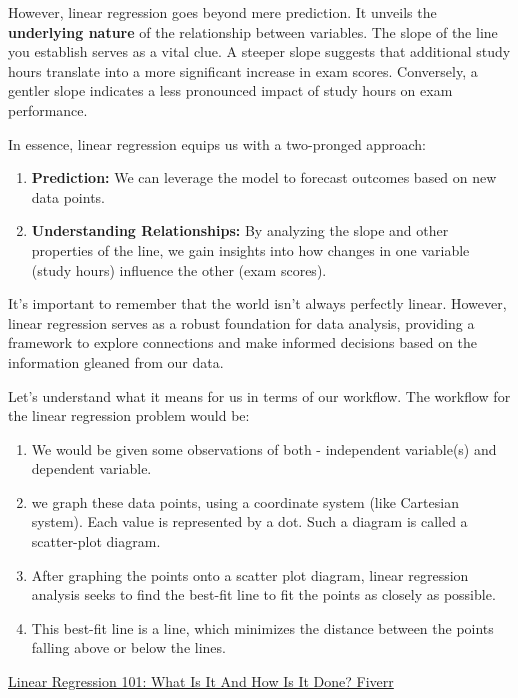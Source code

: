 \documentclass[
  letterpaper,
  paper =a4,
  twoside,
  openright,
  headsepline,
  footsepline,
  listof = totocnumbered,
  chapterprefix = true,
  firstiscover,
  parskip = full*]{scrbook}
\begin{document}
However, linear regression goes beyond mere prediction. It unveils the
\textbf{underlying nature} of the relationship between variables. The
slope of the line you establish serves as a vital clue. A steeper slope
suggests that additional study hours translate into a more significant
increase in exam scores. Conversely, a gentler slope indicates a less
pronounced impact of study hours on exam performance.

In essence, linear regression equips us with a two-pronged approach:

\begin{enumerate}
\def\labelenumi{\arabic{enumi}.}
\item
  \textbf{Prediction:} We can leverage the model to forecast outcomes
  based on new data points.
\item
  \textbf{Understanding Relationships:} By analyzing the slope and other
  properties of the line, we gain insights into how changes in one
  variable (study hours) influence the other (exam scores).
\end{enumerate}

It's important to remember that the world isn't always perfectly linear.
However, linear regression serves as a robust foundation for data
analysis, providing a framework to explore connections and make informed
decisions based on the information gleaned from our data.

Let's understand what it means for us in terms of our workflow. The
workflow for the linear regression problem would be:

\begin{enumerate}
\def\labelenumi{\arabic{enumi}.}
\item
  We would be given some observations of both - independent variable(s)
  and dependent variable.
\item
  we graph these data points, using a coordinate system (like Cartesian
  system). Each value is represented by a dot. Such a diagram is called
  a scatter-plot diagram.
\item
  After graphing the points onto a scatter plot diagram, linear
  regression analysis seeks to find the best-fit line to fit the points
  as closely as possible.
\item
  This best-fit line is a line, which minimizes the distance between the
  points falling above or below the lines.
\end{enumerate}

\href{https://www.fiverr.com/resources/guides/data/linear-regression-101}{Linear
Regression 101: What Is It And How Is It Done? \textbar{} Fiverr}
\end{document}
